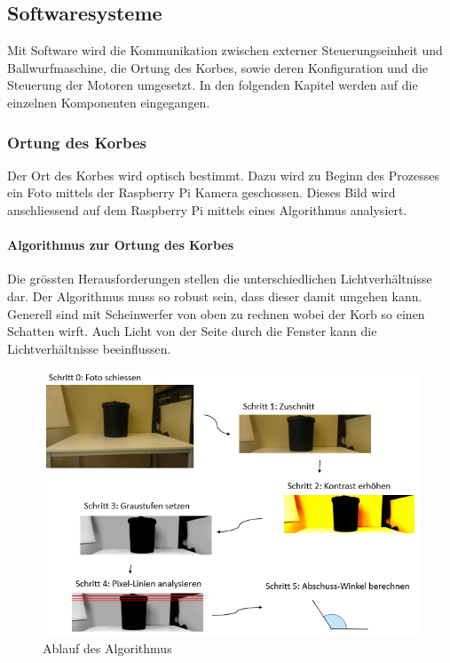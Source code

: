 \subsection{Softwaresysteme}
Mit Software wird die Kommunikation zwischen externer Steuerungseinheit und Ballwurfmaschine, die Ortung des Korbes, sowie deren Konfiguration und die Steuerung der Motoren umgesetzt. In den folgenden Kapitel werden auf die einzelnen Komponenten eingegangen.

\subsubsection{Ortung des Korbes}
Der Ort des Korbes wird optisch bestimmt. Dazu wird zu Beginn des Prozesses ein Foto mittels der Raspberry Pi Kamera geschossen. Dieses Bild wird anschliessend auf dem Raspberry Pi mittels eines Algorithmus analysiert.

\paragraph{Algorithmus zur Ortung des Korbes}
\label{abb-algorithmus-zur-ortung-des-korbes}
Die grössten Herausforderungen stellen die unterschiedlichen Lichtverhältnisse dar. Der Algorithmus muss so robust sein, dass dieser damit umgehen kann. Generell sind mit Scheinwerfer von oben zu rechnen wobei der Korb so einen Schatten wirft. Auch Licht von der Seite durch die Fenster kann die Lichtverhältnisse beeinflussen.

\begin{figure}[h!]
	\centering
	\includegraphics[scale=0.75]{../../fig/ablauf-ortung-des-korbes-algorithmus.png}
	\caption{Ablauf des Algorithmus}
\end{figure}

